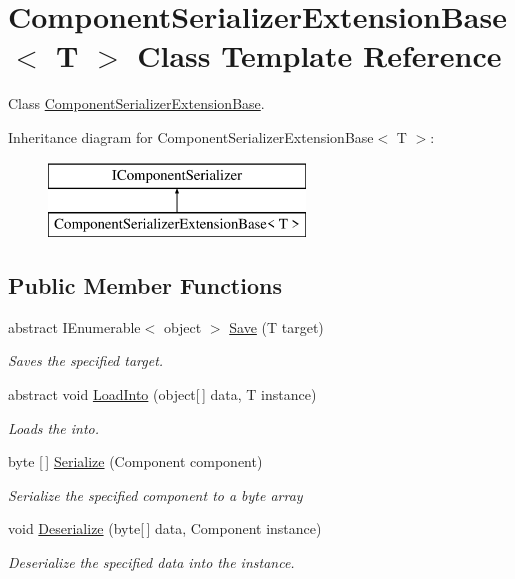 \hypertarget{class_component_serializer_extension_base}{}\section{Component\+Serializer\+Extension\+Base$<$ T $>$ Class Template Reference}
\label{class_component_serializer_extension_base}


Class \hyperlink{class_component_serializer_extension_base}{Component\+Serializer\+Extension\+Base}.  


Inheritance diagram for Component\+Serializer\+Extension\+Base$<$ T $>$\+:\begin{figure}[H]
\begin{center}
\leavevmode
\includegraphics[height=2.000000cm]{class_component_serializer_extension_base}
\end{center}
\end{figure}
\subsection*{Public Member Functions}
\begin{DoxyCompactItemize}
\item 
abstract I\+Enumerable$<$ object $>$ \hyperlink{class_component_serializer_extension_base_a4814a51da69bbdba5219843f04885551}{Save} (T target)
\begin{DoxyCompactList}\small\item\em Saves the specified target. \end{DoxyCompactList}\item 
abstract void \hyperlink{class_component_serializer_extension_base_aabcaabbb4ca501f5b3ddb1d7301699cf}{Load\+Into} (object\mbox{[}$\,$\mbox{]} data, T instance)
\begin{DoxyCompactList}\small\item\em Loads the into. \end{DoxyCompactList}\item 
byte \mbox{[}$\,$\mbox{]} \hyperlink{class_component_serializer_extension_base_a068c9a1c5f90967de5d22bf9357cfca0}{Serialize} (Component component)
\begin{DoxyCompactList}\small\item\em Serialize the specified component to a byte array \end{DoxyCompactList}\item 
void \hyperlink{class_component_serializer_extension_base_a003b02386876cd68c588aef276124b0c}{Deserialize} (byte\mbox{[}$\,$\mbox{]} data, Component instance)
\begin{DoxyCompactList}\small\item\em Deserialize the specified data into the instance. \end{DoxyCompactList}\end{DoxyCompactItemize}


